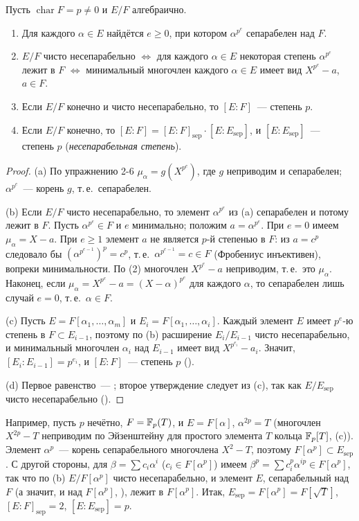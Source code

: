 \begin{proposition}
Пусть $\operatorname{char}F=p\ne0$ и $E/F$ алгебраично.
\begin{enumerate}[label=\textup{(\alph*)}]
\item Для каждого $\alpha\in E$ найдётся $e\ge0$, при котором $\alpha^{p^e}$ сепарабелен над $F$.
\item $E/F$ чисто несепарабельно $\iff$ для каждого $\alpha\in E$ некоторая степень $\alpha^{p^e}$ лежит в $F$ $\iff$ минимальный
многочлен каждого $\alpha\in E$ имеет вид $X^{p^e}-a$, $a\in F$.
\item Если $E/F$ конечно и чисто несепарабельно, то $[E:F]$~--- степень $p$.
\item Если $E/F$ конечно, то $[E:F]=[E:F]_{\mathrm{sep}}\cdot[E:E_{\mathrm{sep}}]$, и $[E:E_{\mathrm{sep}}]$~--- степень $p$
(\emph{несепарабельная степень}).
\end{enumerate}
\end{proposition}

\begin{proof}
(a) По упражнению 2-6 $\mu_\alpha=g(X^{p^e})$, где $g$ неприводим и сепарабелен; $\alpha^{p^e}$~--- корень $g$, т.\,е.\ сепарабелен.

(b) Если $E/F$ чисто несепарабельно, то элемент $\alpha^{p^e}$ из (a) сепарабелен и потому лежит в $F$. Пусть $\alpha^{p^e}\in F$ и
$e$ минимально; положим $a=\alpha^{p^e}$. При $e=0$ имеем $\mu_\alpha=X-a$. При $e\ge1$ элемент $a$ не является $p$-й
степенью в $F$: из $a=c^p$ следовало бы $(\alpha^{p^{e-1}})^p=c^p$, т.\,е.\ $\alpha^{p^{e-1}}=c\in F$ (Фробениус инъективен),
вопреки минимальности. По (2) многочлен $X^{p^e}-a$ неприводим, т.\,е.\ это $\mu_\alpha$. Наконец, если
$\mu_\alpha=X^{p^e}-a=(X-\alpha)^{p^e}$ для каждого $\alpha$, то сепарабелен лишь случай $e=0$, т.\,е.\ $\alpha\in F$.

(c) Пусть $E=F[\alpha_1,\dots,\alpha_m]$ и $E_i=F[\alpha_1,\dots,\alpha_i]$. Каждый элемент $E$ имеет $p^e$-ю степень в $F\subset E_{i-1}$,
поэтому по (b) расширение $E_i/E_{i-1}$ чисто несепарабельно, и минимальный многочлен $\alpha_i$ над $E_{i-1}$ имеет вид
$X^{p^{e_i}}-a_i$. Значит, $[E_i:E_{i-1}]=p^{e_i}$, и $[E:F]$~--- степень $p$ ().

(d) Первое равенство~--- ; второе утверждение следует из (c), так как $E/E_{\mathrm{sep}}$ чисто несепарабельно ().
\end{proof}

Например, пусть $p$ нечётно, $F=\mathbb F_p(T)$, и $E=F[\alpha]$, $\alpha^{2p}=T$ (многочлен $X^{2p}-T$ неприводим по Эйзенштейну
для простого элемента $T$ кольца $\mathbb F_p[T]$, (c)). Элемент $\alpha^p$~--- корень сепарабельного многочлена
$X^2-T$, поэтому $F[\alpha^p]\subset E_{\mathrm{sep}}$. С другой стороны, для $\beta=\sum c_i\alpha^i$ ($c_i\in F[\alpha^p]$) имеем
$\beta^p=\sum c_i^p\alpha^{ip}\in F[\alpha^p]$, так что по (b) $E/F[\alpha^p]$ чисто несепарабельно, и элемент $E$, сепарабельный над $F$
(а значит, и над $F[\alpha^p]$, ), лежит в $F[\alpha^p]$. Итак, $E_{\mathrm{sep}}=F[\alpha^p]=F[\sqrt T]$,
$[E:F]_{\mathrm{sep}}=2$, $[E:E_{\mathrm{sep}}]=p$.

